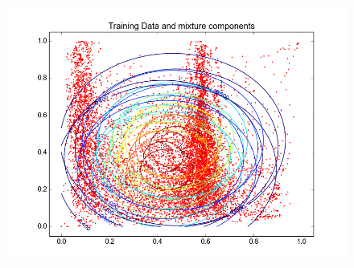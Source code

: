 \documentclass[11pt,a4paper]{article}
\begin{document}
\begin{minipage}[b]{0.25\textwidth}
\begin{figure}[H]
  \centering
  \includegraphics[width=.8\linewidth]{Figures/contours_diagcoast30.png}

  \label{fig:sfig1}
\end{figure}%
\end{minipage}
\end{document}
